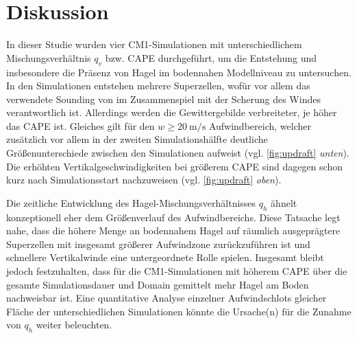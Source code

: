 \section{Diskussion}


In dieser Studie wurden vier CM1-Simulationen mit unterschiedlichem Mischungsverhältnis \(q_v\) bzw. CAPE durchgeführt, um die Entstehung und insbesondere die Präsenz von Hagel im bodennahen Modellniveau zu untersuchen. In den Simulationen entstehen mehrere Superzellen, wofür vor allem das verwendete Sounding von \textcite{weisman1982} im Zusammenspiel mit der Scherung des Windes verantwortlich ist. Allerdings werden die Gewittergebilde verbreiteter, je höher das CAPE ist. Gleiches gilt für den \(w \geq \SI{20}{\m\per\s}\) Aufwindbereich, welcher zusätzlich vor allem in der zweiten Simulationshälfte deutliche Größenunterschiede zwischen den Simulationen aufweist (vgl. \cref{fig:updraft} \textit{unten}). Die erhöhten Vertikalgeschwindigkeiten bei größerem CAPE sind dagegen schon kurz nach Simulationsstart nachzuweisen (vgl. \cref{fig:updraft} \textit{oben}).

Die zeitliche Entwicklung des Hagel-Mischungsverhältnisses \(q_h\) ähnelt konzeptionell eher dem Größenverlauf des Aufwindbereichs. Diese Tatsache legt nahe, dass die höhere Menge an bodennahem Hagel auf räumlich ausgeprägtere Superzellen mit insgesamt größerer Aufwindzone zurückzuführen ist und schnellere Vertikalwinde eine untergeordnete Rolle spielen. Insgesamt bleibt jedoch festzuhalten, dass für die CM1-Simulationen mit höherem CAPE über die gesamte Simulationsdauer und Domain gemittelt mehr Hagel am Boden nachweisbar ist. Eine quantitative Analyse einzelner Aufwindschlots gleicher Fläche der unterschiedlichen Simulationen könnte die Ursache(n) für die Zunahme von \(q_h\) weiter beleuchten.